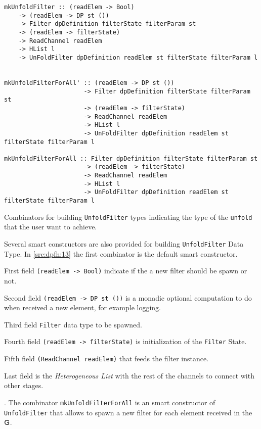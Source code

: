 \begin{listing}[H]
  \begin{verbatim}
mkUnfoldFilter :: (readElem -> Bool) 
    -> (readElem -> DP st ()) 
    -> Filter dpDefinition filterState filterParam st 
    -> (readElem -> filterState)
    -> ReadChannel readElem
    -> HList l 
    -> UnFoldFilter dpDefinition readElem st filterState filterParam l


mkUnfoldFilterForAll' :: (readElem -> DP st ())
                      -> Filter dpDefinition filterState filterParam st
                      -> (readElem -> filterState)
                      -> ReadChannel readElem
                      -> HList l
                      -> UnFoldFilter dpDefinition readElem st filterState filterParam l

mkUnfoldFilterForAll :: Filter dpDefinition filterState filterParam st
                      -> (readElem -> filterState)
                      -> ReadChannel readElem
                      -> HList l
                      -> UnFoldFilter dpDefinition readElem st filterState filterParam l
   \end{verbatim}
  \caption[{[\texttt{Stage.hs}] UnfoldFilter combinators}]{Combinators for building \texttt{UnfoldFilter} types indicating the type of the \texttt{unfold} that the user want to achieve.}
  \label{src:dpfh:13}
\end{listing}

Several smart constructors are also provided for building \texttt{UnfoldFilter} Data Type.
In \autoref{src:dpfh:13} the first combinator is the default smart constructor.  \begin{inparaenum}[i\upshape)]
  \item First field \texttt{(readElem -> Bool)} indicate if the a new filter should be spawn or not.
  \item Second field \texttt{(readElem -> DP st ())} is a monadic optional computation to do when received a new element, for example logging.
  \item Third field \texttt{Filter} data type to be spawned.
  \item Fourth field \texttt{(readElem -> filterState)} is initialization of the \texttt{Filter} State.
  \item Fifth field \texttt{(ReadChannel readElem)} that feeds the filter instance.
  \item Last field is the \emph{Heterogeneous List} with the rest of the channels to connect with other stages.
\end{inparaenum}.
The combinator \texttt{mkUnfoldFilterForAll} is an smart constructor of \texttt{UnfoldFilter} that allows to spawn a new filter for each element received in the $\mathsf{G}$.

